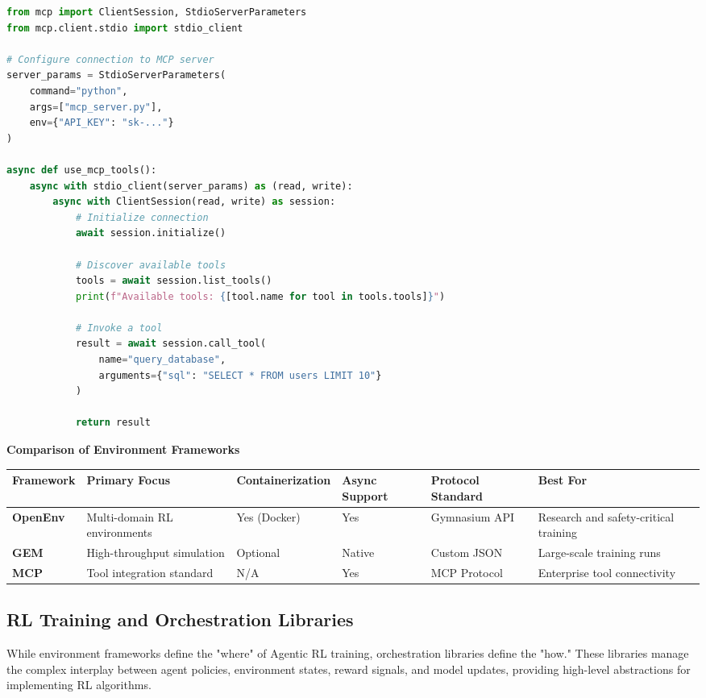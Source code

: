 \begin{lstlisting}[language=Python]
from mcp import ClientSession, StdioServerParameters
from mcp.client.stdio import stdio_client

# Configure connection to MCP server
server_params = StdioServerParameters(
    command="python",
    args=["mcp_server.py"],
    env={"API_KEY": "sk-..."}
)

async def use_mcp_tools():
    async with stdio_client(server_params) as (read, write):
        async with ClientSession(read, write) as session:
            # Initialize connection
            await session.initialize()
            
            # Discover available tools
            tools = await session.list_tools()
            print(f"Available tools: {[tool.name for tool in tools.tools]}")
            
            # Invoke a tool
            result = await session.call_tool(
                name="query_database",
                arguments={"sql": "SELECT * FROM users LIMIT 10"}
            )
            
            return result
\end{lstlisting}

\textbf{Comparison of Environment Frameworks}

\begin{table}[tbp]
\centering
\footnotesize
\begin{tabularx}{\textwidth}{YYYYYY}
\toprule
\textbf{Framework} & \textbf{Primary Focus} & \textbf{Containerization} & \textbf{Async Support} & \textbf{Protocol Standard} & \textbf{Best For} \\
\midrule
\textbf{OpenEnv} & Multi-domain RL environments & Yes (Docker) & Yes & Gymnasium API & Research and safety-critical training \\
\textbf{GEM} & High-throughput simulation & Optional & Native & Custom JSON & Large-scale training runs \\
\textbf{MCP} & Tool integration standard & N/A & Yes & MCP Protocol & Enterprise tool connectivity \\
\bottomrule
\end{tabularx}
\end{table}

\subsection{RL Training and Orchestration Libraries}

While environment frameworks define the "where" of Agentic RL training, orchestration libraries define the "how." These libraries manage the complex interplay between agent policies, environment states, reward signals, and model updates, providing high-level abstractions for implementing RL algorithms.

